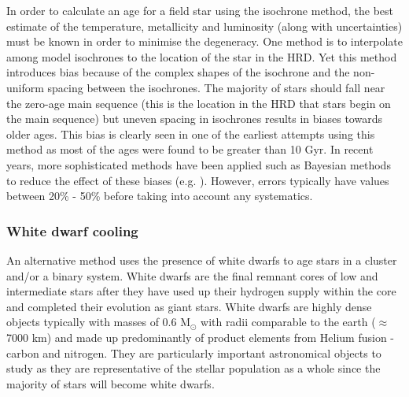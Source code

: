 In order to calculate an age for a field star using the isochrone method, the best estimate of the temperature, metallicity and luminosity (along with uncertainties) must be known in order to minimise the degeneracy. One method is to interpolate among model isochrones to the location of the star in the HRD. Yet this method introduces bias because of the complex shapes of the isochrone and the non-uniform spacing between the isochrones. The majority of stars should fall near the zero-age main sequence (this is the location in the HRD that stars begin on the main sequence) but uneven spacing in isochrones results in biases towards older ages. This bias is clearly seen in one of the earliest attempts using this method \citep{Perrin_etal_1977} as most of the ages were found to be greater than 10 Gyr. In recent years, more sophisticated methods have been applied such as Bayesian methods to reduce the effect of these biases (e.g. \citealt{Takeda_etal_2007}). However, errors typically have values between 20\% - 50\% before taking into account any systematics.

\subsubsection{White dwarf cooling}
An alternative method uses the presence of white dwarfs to age stars in a cluster and/or a binary system. White dwarfs are the final remnant cores of low and intermediate stars after they have used up their hydrogen supply within the core and completed their evolution as giant stars. White dwarfs are highly dense objects typically with masses of 0.6 M$_{\odot}$ with radii comparable to the earth ($\approx$ 7000 km) \citep{Madej_etal_2004} and made up predominantly of product elements from Helium fusion - carbon and nitrogen. They are particularly important astronomical objects to study as they are representative of the stellar population as a whole since the majority of stars will become white dwarfs.

